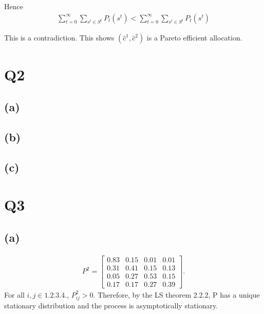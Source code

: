 \documentclass{ltjsarticle}
\begin{document}
Hence
\begin{align*}
    \sum^{\infty}_{t=0} \sum_{s^t\in S^t} P_t(s^t) < \sum^{\infty}_{t=0} \sum_{s^t\in S^t} P_t(s^t) 
\end{align*}

This is a contradiction.
This shows $(\hat{c}^1,\hat{c}^2)$ is a Pareto efficient allocation.




\section*{Q2}

\subsection*{(a)}


\subsection*{(b)}


\subsection*{(c)}


\section*{Q3}
\subsection*{(a)}
\begin{align*}
P^2 = 
    \begin{bmatrix}
    0.83 & 0.15 & 0.01 & 0.01 \\
    0.31 & 0.41 & 0.15 & 0.13 \\
    0.05 & 0.27 & 0.53 & 0.15 \\
    0.17 & 0.17 & 0.27 & 0.39
    \end{bmatrix}.
\end{align*}
For all $i,j\in \qty{1,2,3,4,}$, $P^2_{ij}>0$. Therefore, by the LS theorem 2.2.2, P has a unique stationary distribution and the process is
asymptotically stationary.
\end{document}
